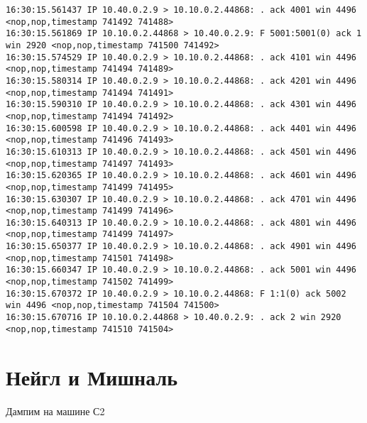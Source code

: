 \documentclass[a4paper,12pt]{article}
\begin{document}
\begin{Verbatim}
16:30:15.561437 IP 10.40.0.2.9 > 10.10.0.2.44868: . ack 4001 win 4496 <nop,nop,timestamp 741492 741488>
16:30:15.561869 IP 10.10.0.2.44868 > 10.40.0.2.9: F 5001:5001(0) ack 1 win 2920 <nop,nop,timestamp 741500 741492>
16:30:15.574529 IP 10.40.0.2.9 > 10.10.0.2.44868: . ack 4101 win 4496 <nop,nop,timestamp 741494 741489>
16:30:15.580314 IP 10.40.0.2.9 > 10.10.0.2.44868: . ack 4201 win 4496 <nop,nop,timestamp 741494 741491>
16:30:15.590310 IP 10.40.0.2.9 > 10.10.0.2.44868: . ack 4301 win 4496 <nop,nop,timestamp 741494 741492>
16:30:15.600598 IP 10.40.0.2.9 > 10.10.0.2.44868: . ack 4401 win 4496 <nop,nop,timestamp 741496 741493>
16:30:15.610313 IP 10.40.0.2.9 > 10.10.0.2.44868: . ack 4501 win 4496 <nop,nop,timestamp 741497 741493>
16:30:15.620365 IP 10.40.0.2.9 > 10.10.0.2.44868: . ack 4601 win 4496 <nop,nop,timestamp 741499 741495>
16:30:15.630307 IP 10.40.0.2.9 > 10.10.0.2.44868: . ack 4701 win 4496 <nop,nop,timestamp 741499 741496>
16:30:15.640313 IP 10.40.0.2.9 > 10.10.0.2.44868: . ack 4801 win 4496 <nop,nop,timestamp 741499 741497>
16:30:15.650377 IP 10.40.0.2.9 > 10.10.0.2.44868: . ack 4901 win 4496 <nop,nop,timestamp 741501 741498>
16:30:15.660347 IP 10.40.0.2.9 > 10.10.0.2.44868: . ack 5001 win 4496 <nop,nop,timestamp 741502 741499>
16:30:15.670372 IP 10.40.0.2.9 > 10.10.0.2.44868: F 1:1(0) ack 5002 win 4496 <nop,nop,timestamp 741504 741500>
16:30:15.670716 IP 10.10.0.2.44868 > 10.40.0.2.9: . ack 2 win 2920 <nop,nop,timestamp 741510 741504>

\end{Verbatim}

\section{Нейгл и Мишналь}

Дампим на машине С2
\end{document}

